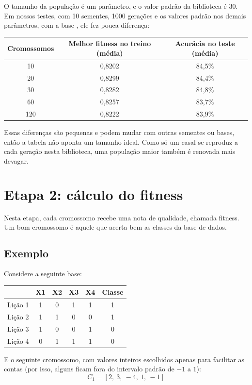 \documentclass[11pt,a4paper]{article}
\newcommand{\metodo}{10 sementes, 1000 gerações e os valores padrão nos demais parâmetros, com a base \code{dados_binario_1.xlsx}}
\newcommand{\code}[1]{\texttt{\detokenize{#1}}}
\newenvironment{tabela}{\par\nopagebreak[4]\vspace{0.3em}\nopagebreak[4]\begingroup\centering\small}{\par\endgroup\vspace{0.6em}}
\begin{document}
O tamanho da população é um parâmetro, e o valor padrão da biblioteca é 30. Em nossos testes, com \metodo, ele fez pouca diferença:

\begin{tabela}
\begin{tabular}{ccc}
\toprule
Cromossomos & Melhor fitness no treino (média) & Acurácia no teste (média)\\
\midrule
10 & 0,8202 & 84,5\%\\
20 & 0,8299 & 84,4\%\\
30 & 0,8282 & 84,8\%\\
60 & 0,8257 & 83,7\%\\
120 & 0,8222 & 83,9\%\\
\bottomrule
\end{tabular}
\end{tabela}

Essas diferenças são pequenas e podem mudar com outras sementes ou bases, então a tabela não aponta um tamanho ideal. Como só um casal se reproduz a cada geração nesta biblioteca, uma população maior também é renovada mais devagar.

\clearpage
\section{Etapa 2: cálculo do fitness}

Nesta etapa, cada cromossomo recebe uma nota de qualidade, chamada fitness. Um bom cromossomo é aquele que acerta bem as classes da base de dados.

\subsection{Exemplo}

Considere a seguinte base:

\begin{tabela}
\begin{tabular}{lccccc}
\toprule
 & X1 & X2 & X3 & X4 & Classe\\
\midrule
Lição 1 & 1 & 0 & 1 & 1 & 1\\
Lição 2 & 1 & 1 & 0 & 0 & 1\\
Lição 3 & 1 & 0 & 0 & 1 & 0\\
Lição 4 & 0 & 1 & 1 & 1 & 0\\
\bottomrule
\end{tabular}
\end{tabela}

E o seguinte cromossomo, com valores inteiros escolhidos apenas para facilitar as contas (por isso, alguns ficam fora do intervalo padrão de $-1$ a $1$):
\[ C_1 = [2,\ 3,\ -4,\ 1,\ -1] \]
\end{document}
